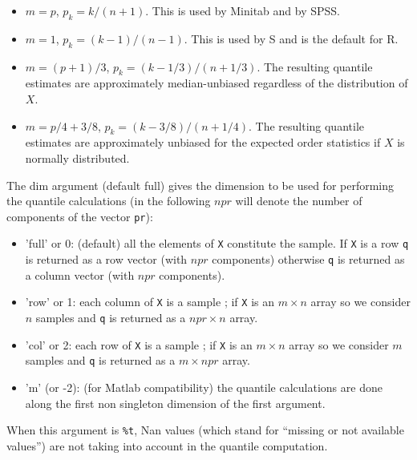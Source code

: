 \begin{mandescription}
\begin{description}
\begin{itemize}
\item {} $m=p$, $p_k = k / (n + 1)$. This is used by Minitab and by SPSS.

\item {} $m=1$, $p_k = (k - 1) / (n - 1)$. This is used by S and is the default for R.

\item {} $m=(p+1)/3$, $p_k = (k - 1/3) / (n + 1/3)$.  The resulting
          quantile estimates are approximately median-unbiased
          regardless of the distribution of $X$.

\item {} $m = p/4 + 3/8$, $p_k = (k - 3/8) / (n + 1/4)$.  The resulting
          quantile estimates are approximately unbiased for the
          expected order statistics if $X$ is normally distributed.

\end{itemize}
\end{description}

  The dim argument (default full) gives the dimension to be used for performing the quantile 
calculations (in the following $npr$ will denote the number of components of the vector \verb+pr+):
  \begin{itemize}
    \item 'full' or 0: (default) all the elements of \verb+X+ constitute the sample. If  \verb+X+ is a row
     \verb+q+ is returned as a row vector (with $npr$ components) otherwise \verb+q+ is returned 
     as a column vector (with $npr$ components).
                       
    \item 'row' or 1: each column  of \verb+X+ is a sample ; if  \verb+X+ is an $m \times n$ array
                      so we consider $n$ samples and \verb+q+ is returned as a $npr \times n$ array.
    \item 'col' or 2: each row  of \verb+X+ is a sample ; if  \verb+X+ is an $m \times n$ array
                      so we consider $m$ samples and  \verb+q+ is returned as a $m \times npr$ array.
    \item 'm' (or -2): (for Matlab compatibility) the quantile calculations are done along the first non 
          singleton dimension of the first argument.
  \end{itemize}

   When this argument is \verb+%t+,  Nan values (which stand for ``missing or not available values'') 
 are not taking into account in the quantile computation.

\end{mandescription}
